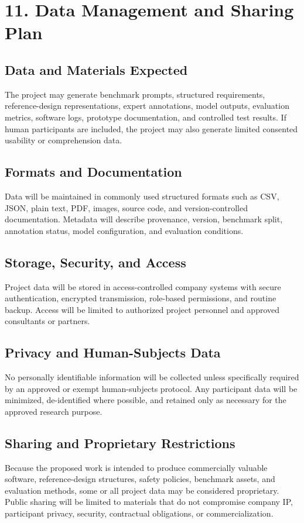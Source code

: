 \documentclass[11pt,letterpaper]{article}
\begin{document}
\section*{11. Data Management and Sharing Plan}

\subsection*{Data and Materials Expected}
The project may generate benchmark prompts, structured requirements,
reference-design representations, expert annotations, model outputs, evaluation
metrics, software logs, prototype documentation, and controlled test results.
If human participants are included, the project may also generate limited
consented usability or comprehension data.

\subsection*{Formats and Documentation}
Data will be maintained in commonly used structured formats such as CSV, JSON,
plain text, PDF, images, source code, and version-controlled documentation.
Metadata will describe provenance, version, benchmark split, annotation status,
model configuration, and evaluation conditions.

\subsection*{Storage, Security, and Access}
Project data will be stored in access-controlled company systems with secure
authentication, encrypted transmission, role-based permissions, and routine
backup. Access will be limited to authorized project personnel and approved
consultants or partners.

\subsection*{Privacy and Human-Subjects Data}
No personally identifiable information will be collected unless specifically
required by an approved or exempt human-subjects protocol. Any participant data
will be minimized, de-identified where possible, and retained only as necessary
for the approved research purpose.

\subsection*{Sharing and Proprietary Restrictions}
Because the proposed work is intended to produce commercially valuable
software, reference-design structures, safety policies, benchmark assets, and
evaluation methods, some or all project data may be considered proprietary.
Public sharing will be limited to materials that do not compromise company IP,
participant privacy, security, contractual obligations, or commercialization.
\end{document}
